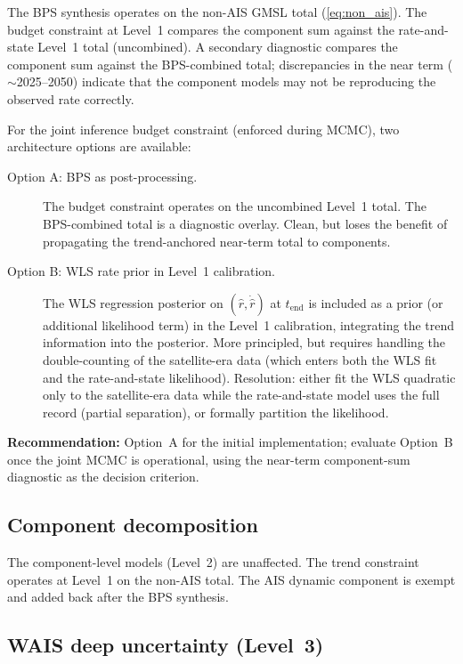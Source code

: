 \documentclass[11pt]{article}
\newcommand{\tend}{t_{\mathrm{end}}}
\begin{document}
The BPS synthesis operates on the non-AIS GMSL total (\cref{eq:non_ais}).  The budget constraint at Level~1 compares the component sum against the rate-and-state Level~1 total (uncombined).  A secondary diagnostic compares the component sum against the BPS-combined total; discrepancies in the near term ($\sim$2025--2050) indicate that the component models may not be reproducing the observed rate correctly.

For the joint inference budget constraint (enforced during MCMC), two architecture options are available:
\begin{description}
  \item[Option A: BPS as post-processing.]  The budget constraint operates on the uncombined Level~1 total.  The BPS-combined total is a diagnostic overlay.  Clean, but loses the benefit of propagating the trend-anchored near-term total to components.
  \item[Option B: WLS rate prior in Level~1 calibration.]  The WLS regression posterior on $(\hat{r}, \dot{\hat{r}})$ at $\tend$ is included as a prior (or additional likelihood term) in the Level~1 calibration, integrating the trend information into the posterior.  More principled, but requires handling the double-counting of the satellite-era data (which enters both the WLS fit and the rate-and-state likelihood).  Resolution: either fit the WLS quadratic only to the satellite-era data while the rate-and-state model uses the full record (partial separation), or formally partition the likelihood.
\end{description}

\textbf{Recommendation:} Option~A for the initial implementation; evaluate Option~B once the joint MCMC is operational, using the near-term component-sum diagnostic as the decision criterion.

\subsection{Component decomposition}

The component-level models (Level~2) are unaffected.  The trend constraint operates at Level~1 on the non-AIS total.  The AIS dynamic component is exempt and added back after the BPS synthesis.

\subsection{WAIS deep uncertainty (Level~3)}
\end{document}
